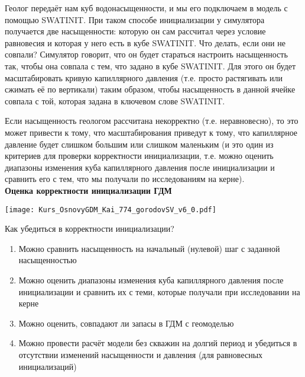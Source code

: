 Геолог передаёт нам куб водонасыщенности, и мы его подключаем в модель с помощью SWATINIT.
При таком способе инициализации у симулятора получается две насыщенности: которую он сам рассчитал через условие равновесия и которая у него есть в кубе SWATINIT.
Что делать, если они не совпали?
Симулятор говорит, что он будет стараться настроить насыщенность так, чтобы она совпала с тем, что задано в кубе SWATINIT.
Для этого он будет масштабировать кривую капиллярного давления (т.е. просто растягивать или сжимать её по вертикали) таким образом, чтобы насыщенность в данной ячейке совпала с той, которая задана в ключевом слове SWATINIT.

Если насыщенность геологом рассчитана некорректно (т.е. неравновесно), то это может привести к тому, что масштабирования приведут к тому, что капиллярное давление будет слишком большим или слишком маленьким (и это один из критериев для проверки корректности инициализации, т.е. можно оценить диапазоны изменения куба капиллярного давления после инициализации и сравнить его с тем, что мы получали по исследованиям на керне).
\\

\textbf{Оценка корректности инициализации ГДМ}

\texttt{[image: Kurs\_OsnovyGDM\_Kai\_774\_gorodovSV\_v6\_0.pdf]}

Как убедиться в корректности инициализации?

\begin{enumerate}
	\item Можно сравнить насыщенность на начальный (нулевой) шаг с заданной насыщенностью
	\item Можно оценить диапазоны изменения куба капиллярного давления после инициализации и сравнить их с теми, которые получали при исследовании на керне
	\item Можно оценить, совпадают ли запасы в ГДМ с геомоделью
	\item Можно провести расчёт модели без скважин на долгий период и убедиться в отсутствии изменений насыщенности и давления (для равновесных инициализаций)
\end{enumerate}


